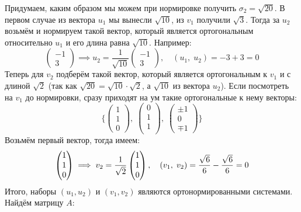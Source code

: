Придумаем, каким образом мы можем при нормировке получить $\sigma_2 = \sqrt{20}$. В первом случае из вектора $u_1$ мы вынесли $\sqrt{10}$, из $v_1$ получили $\sqrt{3}$. Тогда за $u_2$ возьмём и нормируем такой вектор, который является ортогональным относительно $u_1$ и его длина равна $\sqrt{10}$. Например:
\[
    \begin{pmatrix}
        -1 \\
        3
    \end{pmatrix}
    \implies
    u_2 =
    \frac{1}{\sqrt{10}}
    \begin{pmatrix}
        -1 \\
        3
    \end{pmatrix}, \quad
    (u_1,\; u_2) = -3 + 3 = 0
\]
Теперь для $v_2$ подберём такой вектор, который является ортогональным к $v_1$ и с длиной $\sqrt{2}$ (так как $\sqrt{20} = \sqrt{10} \cdot \sqrt{2}$, а $\sqrt{10}$ из вектора $u_2$). Если посмотреть на $v_1$ до нормировки, сразу приходят на ум такие ортогональные к нему векторы:
\[
    \{
    \begin{pmatrix}
        1 \\
        1 \\
        0
    \end{pmatrix},\;
    \begin{pmatrix}
        0 \\
        1 \\
        1 \\
    \end{pmatrix},\;
    \begin{pmatrix}
        \pm 1 \\
        0     \\
        \mp 1
    \end{pmatrix}
    \}
\]
Возьмём первый вектор, тогда имеем:
\[
    \begin{pmatrix}
        1 \\
        1 \\
        0
    \end{pmatrix}
    \implies
    v_2 = \frac{1}{\sqrt{2}}
    \begin{pmatrix}
        1 \\
        1 \\
        0
    \end{pmatrix}, \quad
    (v_1, \;v_2) = \frac{\sqrt{6}}{6} - \frac{\sqrt{6}}{6} = 0
\]
Итого, наборы $(u_1, u_2)$ и $(v_1, v_2)$ являются ортонормированными системами. Найдём матрицу $A$:
